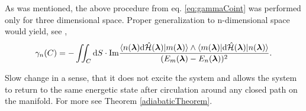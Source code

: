 As was mentioned, the above procedure from eq. \ref{eq:gammaCoint} was performed only for three dimensional space. Proper generalization to n-dimensional space would yield, see \citep{berry1984},
\begin{equation}
    \gamma_n(C) = -\iint_C \mathrm{d} S \cdot\textrm{Im} \frac{
            \braket{n({\bm\lambda})\mathrm{d} \hat{\mathcal{H}}({\bm\lambda}) |m({\bm\lambda})}\wedge \braket{m({\bm\lambda})|\mathrm{d}\hat{\mathcal{H}}({\bm\lambda})|n({\bm\lambda})}    
             }{
(E_m({\bm\lambda})-E_n({\bm\lambda}))^2
             }.
\end{equation}




\begin{definition}[Adibaticity]
    Slow change in a sense, that it does not excite the system and allows the system to return to the same energetic state after circulation around any closed path on the manifold. For more see Theorem \ref{adiabaticTheorem}.
\end{definition}




